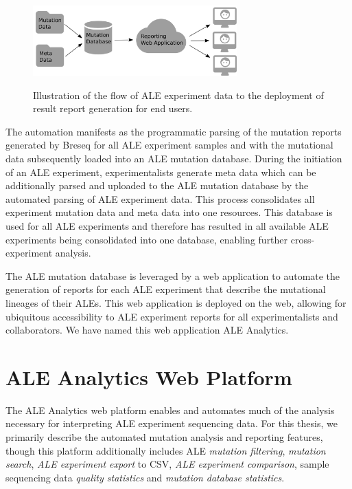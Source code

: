 \documentclass[12pt,final,masters,chapterheads]{ucsd}  %
\begin{document}
\begin{figure}[H]
  \caption{Illustration of the flow of ALE experiment data to the deployment of result report generation for end users.}
  \centering
  \includegraphics[width=0.7\textwidth]{deployment_diagram.png}
  \label{fig:deployment}
\end{figure}

The automation manifests as the programmatic parsing of the mutation reports generated by Breseq for all ALE experiment samples and with the mutational data subsequently loaded into an ALE mutation database. During the initiation of an ALE experiment, experimentalists generate meta data which can be additionally parsed and uploaded to the ALE mutation database by the automated parsing of ALE experiment data. This process consolidates all experiment mutation data and meta data into one resources. This database is used for all ALE experiments and therefore has resulted in all available ALE experiments being consolidated into one database, enabling further cross-experiment analysis.

The ALE mutation database is leveraged by a web application to automate the generation of reports for each ALE experiment that describe the mutational lineages of their ALEs. This web application is deployed on the web, allowing for ubiquitous accessibility to ALE experiment reports for all experimentalists and collaborators. We have named this web application ALE Analytics.

\section{ALE Analytics Web Platform}

%
%

The ALE Analytics web platform enables and automates much of the analysis necessary for interpreting ALE experiment sequencing data. For this thesis, we primarily describe the automated mutation analysis and reporting features, though this platform additionally includes ALE \textit{mutation filtering},  \textit{mutation search}, \textit{ALE experiment export} to CSV, \textit{ALE experiment comparison}, sample sequencing data \textit{quality statistics} and \textit{mutation database statistics}.%
\end{document}
